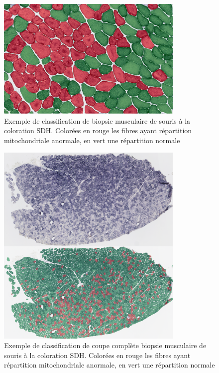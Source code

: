 \begin{figure}[htbp]
 \centering
 \includegraphics[width=0.8\textwidth]{figures/sdh_paint.png}
 \caption[Exemple de classification de biopsie musculaire de souris à la coloration SDH]{Exemple de classification de biopsie musculaire de souris à la coloration SDH. Colorées en rouge les fibres ayant répartition mitochondriale anormale, en vert une répartition normale}
 \label{fig:sdh_paint}
\end{figure}
\begin{figure}[htbp]
 \centering
 \includegraphics[width=0.8\textwidth]{figures/wsi_sdh.png}
 \caption[Exemple de classification de coupe complète biopsie musculaire de souris à la coloration SDH]{Exemple de classification de coupe complète biopsie musculaire de souris à la coloration SDH. Colorées en rouge les fibres ayant répartition mitochondriale anormale, en vert une répartition normale}
 \label{fig:sdh_wsi_paint}
\end{figure}

